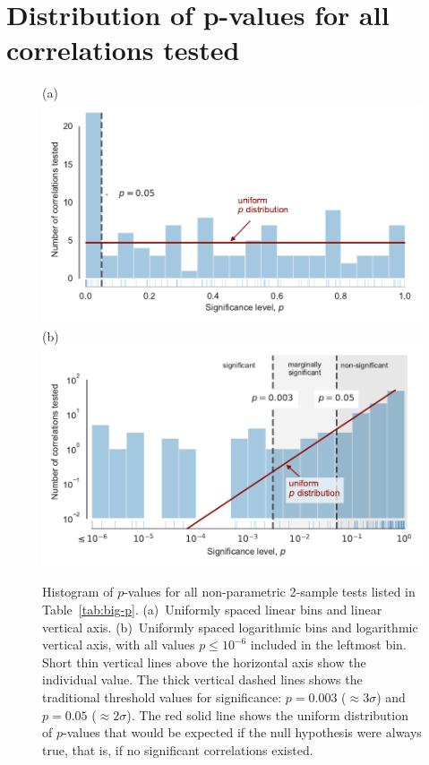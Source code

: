 
\section{Distribution of p-values for all correlations tested}
\label{sec:distr-p-values}

\begin{figure}
  (a)\\
  \includegraphics[width=\linewidth]{figs/p-value-histogram-new-linear}\\
  (b)\\
  \includegraphics[width=\linewidth]{figs/p-value-histogram-new}
  \caption{Histogram of \(p\)-values for all non-parametric 2-sample
    tests listed in Table~\ref{tab:big-p}. (a)~Uniformly spaced linear
    bins and linear vertical axis. (b)~Uniformly spaced logarithmic
    bins and logarithmic vertical axis, with all values
    \(p \le 10^{-6}\) included in the leftmost bin.  Short thin vertical
    lines above the horizontal axis show the individual value.  The
    thick vertical dashed lines shows the traditional threshold values
    for significance: \(p = 0.003\) (\(\approx 3 \sigma\)) and
    \(p = 0.05\) (\(\approx 2 \sigma\)). The red solid line shows the uniform
    distribution of \(p\)-values that would be expected if the null
    hypothesis were always true, that is, if no significant
    correlations existed.}
  \label{fig:histo-p-values}
\end{figure}

